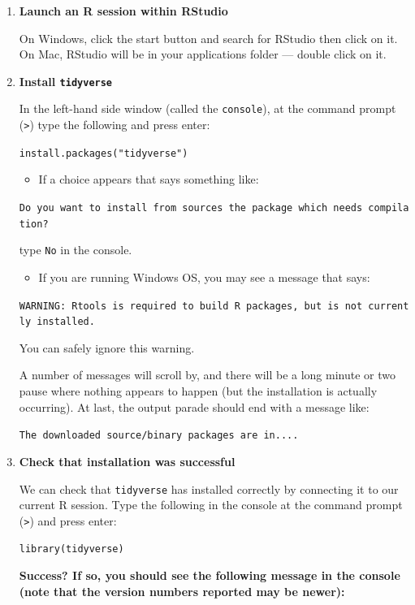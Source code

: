 \documentclass[]{book}
\providecommand{\tightlist}{%
  \setlength{\itemsep}{0pt}\setlength{\parskip}{0pt}}
\begin{document}
\begin{enumerate}
\def\labelenumi{\arabic{enumi}.}
\item
  \textbf{Launch an R session within RStudio}

  On Windows, click the start button and search for RStudio then click
  on it. On Mac, RStudio will be in your applications folder --- double
  click on it.
\item
  \textbf{Install \texttt{tidyverse}}

  In the left-hand side window (called the \texttt{console}), at the
  command prompt (\texttt{\textgreater{}}) type the following and press
  enter:

  \texttt{install.packages("tidyverse")}

  \begin{itemize}
  \tightlist
  \item
    If a choice appears that says something like:
  \end{itemize}

  \texttt{Do\ you\ want\ to\ install\ from\ sources\ the\ package\ which\ needs\ compilation?}

  type \texttt{No} in the console.

  \begin{itemize}
  \tightlist
  \item
    If you are running Windows OS, you may see a message that says:
  \end{itemize}

  \texttt{WARNING:\ Rtools\ is\ required\ to\ build\ R\ packages,\ but\ is\ not\ currently\ installed.}

  You can safely ignore this warning.

  A number of messages will scroll by, and there will be a long minute
  or two pause where nothing appears to happen (but the installation is
  actually occurring). At last, the output parade should end with a
  message like:

  \texttt{The\ downloaded\ source/binary\ packages\ are\ in....}
\item
  \textbf{Check that installation was successful}

  We can check that \texttt{tidyverse} has installed correctly by
  connecting it to our current R session. Type the following in the
  console at the command prompt (\texttt{\textgreater{}}) and press
  enter:

  \texttt{library(tidyverse)}

  \textbf{Success? If so, you should see the following message in the
  console (note that the version numbers reported may be newer):}


\end{enumerate}
\end{document}
